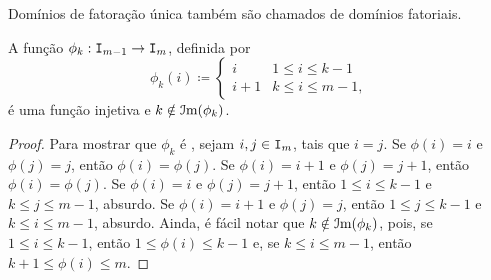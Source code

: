 	Domínios de fatoração única também são chamados de domínios fatoriais.

\begin{prop}
	A função $\phi_k : \mathtt I_{m-1} \to \mathtt I_m$, definida por
	\begin{equation*}
	\phi_k(i) \coloneqq
		\begin{cases}
		i & 1 \leq i \leq k-1 \\
		i+1 & k \leq i \leq m-1,
		\end{cases}
	\end{equation*}
é uma função injetiva e $k \notin \mathcal{I}\mathrm{m}(\phi_k)$.

\end{prop}
\begin{proof}
	Para mostrar que $\phi_k$ é , sejam $i,j \in \mathtt I_m$, tais que $i=j$. Se $\phi(i)=i$ e $\phi(j)=j$, então $\phi(i)=\phi(j)$. Se $\phi(i)=i+1$ e $\phi(j)=j+1$, então $\phi(i)=\phi(j)$. Se $\phi(i)=i$ e $\phi(j)=j+1$, então $1 \leq i \leq k-1$ e $k \leq j \leq m-1$, absurdo. Se $\phi(i)=i+1$ e $\phi(j)=j$, então $1 \leq j \leq k-1$ e $k \leq i \leq m-1$, absurdo. Ainda, é fácil notar que $k \notin \mathcal{I}\mathrm{m}(\phi_k)$, pois, se $1 \leq i \leq k-1$, então $1 \leq \phi(i) \leq k-1$ e, se $k \leq i \leq m-1$, então $k+1 \leq \phi(i) \leq m$.
\end{proof}

